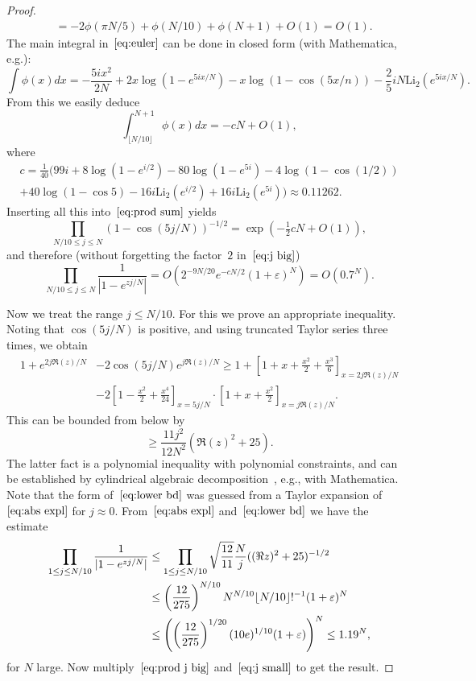 \documentclass[a4paper]{amsart}
\begin{document}
\begin{proof}
\begin{align*}
    &= -2\phi(\pi N/5)+\phi(N/10)+\phi(N+1)+O(1) = O(1).
  \end{align*}
  The main integral in~$\eqref{eq:euler}$ can be done in closed form
  (with Mathematica, e.g.):
  \[
    \int \phi(x) dx = -\frac{5i x^2}{2N} + 2x \log(1-e^{5ix/N})
    - x \log(1-\cos(5x/n)) - \frac25 i N \mathrm{Li}_2(e^{5ix/N}).
  \]
  From this we easily deduce
  \[
     \int_{\lfloor N/10 \rfloor}^{N+1} \phi(x)dx = -c N + O(1),
  \]
  where
  \begin{multline*}
    c = \frac{1}{40}(99 i +8\log(1-e^{i/2}) -80 \log(1-e^{5i})
    -4\log(1-\cos(1/2)) \\
     + 40 \log(1-\cos 5)     -16i \mathrm{Li}_2(e^{i/2})
    +16i \mathrm{Li}_2(e^{5i})) \approx 0.11262.
  \end{multline*}
  Inserting all this into~$\eqref{eq:prod sum}$ yields
  \[
    \prod_{N/10 \leq j\leq N}(1-\cos(5j/N))^{-1/2} = \exp(-\tfrac12 cN + O(1)),
  \]
  and therefore (without forgetting the factor~$2$ in~$\eqref{eq:j big}$)
  \begin{equation}\label{eq:prod j big}
    \prod_{N/10 \leq j\leq N} \frac{1}{|1-e^{z j/N}|} = O(2^{-9N/20} e^{-cN/2}
    (1+\varepsilon)^N ) = O(0.7^N).
  \end{equation}
  
  Now we treat the range $j\leq N/10$. For this we prove an appropriate
  inequality. Noting that $\cos(5j/N)$ is positive, and using truncated
  Taylor series three times, we obtain
  \begin{align*}
    1+  e^{2j \Re(z)/N}& - 2\cos(5j/N)  e^{j \Re(z)/N} 
    \geq 1+\left[1+x+\frac{x^2}{2}+\frac{x^3}{6} \right]_{x=2j \Re(z)/N} \\
    &- 2\left[1-\frac{x^2}{2}+\frac{x^4}{24} \right]_{x=5j/N} \cdot
    \left[1+x+\frac{x^2}{2} \right]_{x=j \Re(z)/N}.
  \end{align*}
  This can be bounded from below by
  \begin{equation}\label{eq:lower bd}
    \geq \frac{11j^2}{12N^2}(\Re(z)^2+25).
  \end{equation}
  The latter fact is a polynomial inequality with polynomial constraints,
  and can be established by cylindrical algebraic
  decomposition~\cite{Co75}, e.g., with Mathematica.
  Note that the form of~$\eqref{eq:lower bd}$ was guessed from a Taylor expansion
  of~$\eqref{eq:abs expl}$
  for $j\approx 0$. From~$\eqref{eq:abs expl}$
  and~$\eqref{eq:lower bd}$ we have the estimate
  \begin{align}
    \prod_{1\leq j\leq N/10} \frac{1}{|1-e^{z j/N}|} &\leq \prod_{1\leq j\leq N/10}
      \sqrt{\frac{12}{11}} \frac{N}{j} ((\Re z)^2 +25)^{-1/2} \notag \\
    &\leq \left( \frac{12}{275} \right)^{N/10} N^{N/10} \lfloor N/10 \rfloor!^{-1}(1+\varepsilon)^N  \notag \\
    & \leq \left(
     \left(\frac{12}{275}\right)^{1/20}(10e)^{1/10}(1+\varepsilon)\right)^N
    \leq 1.19^N, \label{eq:j small}
  \end{align}
  for $N$ large.
  Now multiply~$\eqref{eq:prod j big}$ and~$\eqref{eq:j small}$ to
  get the result.
\end{proof}
\end{document}
